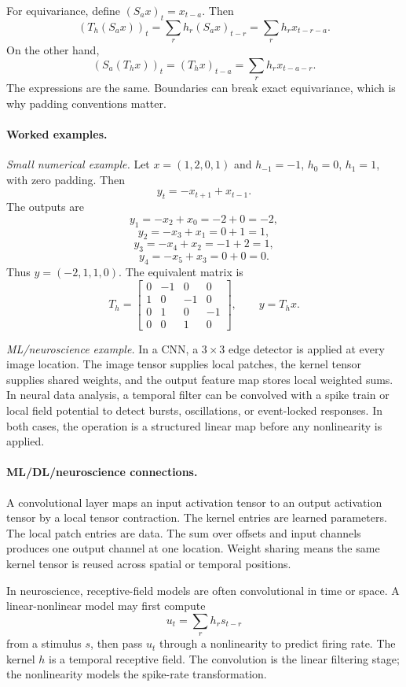 For equivariance, define \((S_a x)_t=x_{t-a}\). Then
\[
(T_h(S_a x))_t
=\sum_r h_r(S_a x)_{t-r}
=\sum_r h_rx_{t-r-a}.
\]
On the other hand,
\[
(S_a(T_hx))_t
=(T_hx)_{t-a}
=\sum_r h_rx_{t-a-r}.
\]
The expressions are the same. Boundaries can break exact equivariance, which is why padding conventions matter.

\paragraph{Worked examples.}
\emph{Small numerical example.} Let \(x=(1,2,0,1)\) and \(h_{-1}=-1\), \(h_0=0\), \(h_1=1\), with zero padding. Then
\[
y_t=-x_{t+1}+x_{t-1}.
\]
The outputs are
\[
y_1=-x_2+x_0=-2+0=-2,
\]
\[
y_2=-x_3+x_1=0+1=1,
\]
\[
y_3=-x_4+x_2=-1+2=1,
\]
\[
y_4=-x_5+x_3=0+0=0.
\]
Thus \(y=(-2,1,1,0)\). The equivalent matrix is
\[
T_h=
\begin{bmatrix}
0&-1&0&0\\
1&0&-1&0\\
0&1&0&-1\\
0&0&1&0
\end{bmatrix},
\qquad
y=T_hx.
\]

\emph{ML/neuroscience example.} In a CNN, a \(3\times 3\) edge detector is applied at every image location. The image tensor supplies local patches, the kernel tensor supplies shared weights, and the output feature map stores local weighted sums. In neural data analysis, a temporal filter can be convolved with a spike train or local field potential to detect bursts, oscillations, or event-locked responses. In both cases, the operation is a structured linear map before any nonlinearity is applied.

\paragraph{ML/DL/neuroscience connections.}
A convolutional layer maps an input activation tensor to an output activation tensor by a local tensor contraction. The kernel entries are learned parameters. The local patch entries are data. The sum over offsets and input channels produces one output channel at one location. Weight sharing means the same kernel tensor is reused across spatial or temporal positions.

In neuroscience, receptive-field models are often convolutional in time or space. A linear-nonlinear model may first compute
\[
u_t=\sum_r h_r s_{t-r}
\]
from a stimulus \(s\), then pass \(u_t\) through a nonlinearity to predict firing rate. The kernel \(h\) is a temporal receptive field. The convolution is the linear filtering stage; the nonlinearity models the spike-rate transformation.

